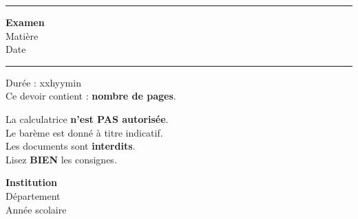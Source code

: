 \begin{titlepage}
    \begin{center}

    \vfill
    \hrule
    
    \vspace{0.2cm}
    
    \Huge
    \textbf{Examen}
    \\
    \huge
    Matière\\
    Date\\
    \vspace{0.2cm}
    
    \hrule
    
    \vspace{2cm}
    
    \Large
    Durée  :  xxhyymin\\
    Ce devoir  contient : \textbf{nombre de pages}.

    \vfill

    \begin{tcolorbox}[title={Règles}]
        La  calculatrice \textbf{n'est PAS autorisée}.\\
        Le  barème  est  donné  à  titre  indicatif.\\
        Les documents sont \textbf{interdits}.\\
        Lisez \textbf{BIEN} les consignes.
    \end{tcolorbox}

    \vfill

    \Large
    \textbf{Institution}\\
    Département\\
    Année scolaire\\
    
    \end{center}
\end{titlepage}